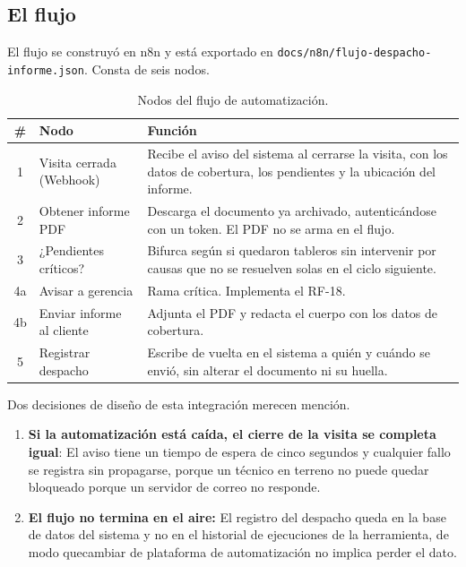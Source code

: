 \documentclass[10pt,letterpaper]{article}
\begin{document}
\subsection{El flujo}

El flujo se construyó en n8n y está exportado en
\texttt{docs/n8n/flujo-despacho-informe.json}. Consta de seis nodos.

\begin{table}[H]
\centering
\small
\begin{tabular}{@{}cp{3.6cm}p{10cm}@{}}
\toprule
\textbf{\#} & \textbf{Nodo} & \textbf{Función} \\
\midrule
1 & Visita cerrada (Webhook) & Recibe el aviso del sistema al cerrarse la
visita, con los datos de cobertura, los pendientes y la ubicación del informe. \\
2 & Obtener informe PDF & Descarga el documento ya archivado, autenticándose
con un token. El PDF no se arma en el flujo. \\
3 & ¿Pendientes críticos? & Bifurca según si quedaron tableros sin intervenir
por causas que no se resuelven solas en el ciclo siguiente. \\
4a & Avisar a gerencia & Rama crítica. Implementa el RF-18. \\
4b & Enviar informe al cliente & Adjunta el PDF y redacta el cuerpo con los
datos de cobertura. \\
5 & Registrar despacho & Escribe de vuelta en el sistema a quién y cuándo se
envió, sin alterar el documento ni su huella. \\
\bottomrule
\end{tabular}
\caption{Nodos del flujo de automatización.}
\end{table}

Dos decisiones de diseño de esta integración merecen mención. 
\begin{enumerate}
\item\textbf{Si la automatización está caída, el cierre de la visita se completa
igual}: El aviso tiene un tiempo de espera de cinco segundos y cualquier fallo
se registra sin propagarse, porque un técnico en terreno no puede quedar
bloqueado porque un servidor de correo no responde.
\item\textbf{El flujo no termina en el aire:} El registro del despacho queda en la base de datos del sistema y no en el historial de ejecuciones de la herramienta, de modo quecambiar de plataforma de automatización no implica perder el dato.
\end{enumerate}
\end{document}
